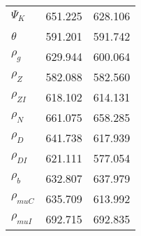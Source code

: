 \begin{center}
\begin{longtable}{lcc}
$ {\Psi_{K}}           $	 & 	     651.225	 & 	     628.106 \\ 
$ {\theta}             $	 & 	     591.201	 & 	     591.742 \\ 
$ {\rho_g}             $	 & 	     629.944	 & 	     600.064 \\ 
$ {\rho_Z}             $	 & 	     582.088	 & 	     582.560 \\ 
$ {\rho_{ZI}}          $	 & 	     618.102	 & 	     614.131 \\ 
$ {\rho_N}             $	 & 	     661.075	 & 	     658.285 \\ 
$ {\rho_D}             $	 & 	     641.738	 & 	     617.939 \\ 
$ {\rho_{DI}}          $	 & 	     621.111	 & 	     577.054 \\ 
$ {\rho_b}             $	 & 	     632.807	 & 	     637.979 \\ 
$ {\rho_{muC}}         $	 & 	     635.709	 & 	     613.992 \\ 
$ {\rho_{muI}}         $	 & 	     692.715	 & 	     692.835 \\ 
\end{longtable}
 \end{center}
